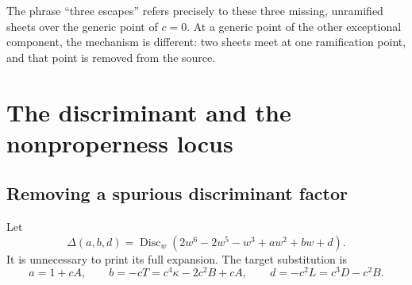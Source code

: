 \documentclass[11pt,a4paper]{article}
\theoremstyle{definition}
\newcommand{\Disc}{\operatorname{Disc}}
\newcommand{\kk}{\kappa}
\begin{document}
The phrase ``three escapes'' refers precisely to these three missing,
unramified sheets over the generic point of $c=0$. At a generic point of
the other exceptional component, the mechanism is different: two sheets
meet at one ramification point, and that point is removed from the source.

\section{The discriminant and the nonproperness locus}
\label{f6:sec:discriminant}

\subsection{Removing a spurious discriminant factor}
Let
\begin{equation}\label{f6:eq:universaldisc}
 \Delta(a,b,d)=\Disc_w(2w^6-2w^5-w^3+aw^2+bw+d).
\end{equation}
It is unnecessary to print its full expansion. The target substitution is
\begin{equation}\label{f6:eq:discsub}
 a=1+cA,\qquad b=-cT=c^4\kk-2c^2B+cA,
 \qquad d=-c^2L=c^3D-c^2B.
\end{equation}
\end{document}
